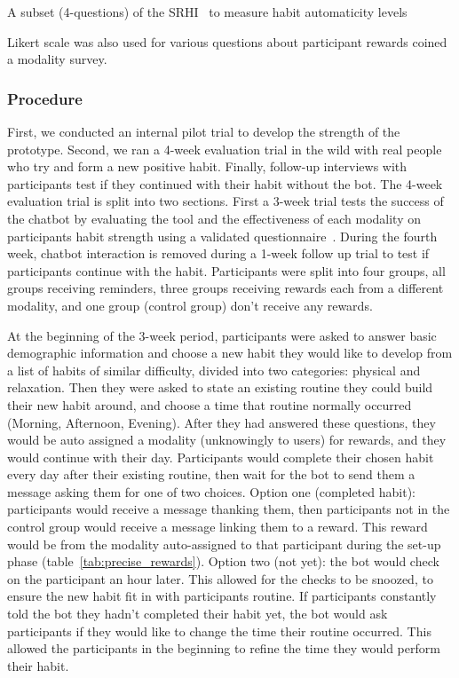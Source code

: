 \documentclass{scaffold/sigchi}
\begin{document}
A subset (4-questions) of the SRHI~\cite{article_habit_strength}  to measure habit automaticity levels

Likert scale was also used for various questions about participant rewards coined a modality survey.
 
 
\subsubsection{Procedure}
First, we conducted an internal pilot trial to develop the strength of the prototype. Second, we ran a 4-week evaluation trial in the wild with real people who try and form a new positive habit. Finally, follow-up interviews with participants test if they continued with their habit without the bot.\newline
\newline
The 4-week evaluation trial is split into two sections. First a 3-week trial tests the success of the chatbot by evaluating the tool and the effectiveness of each modality on participants habit strength using a validated questionnaire~\cite{article_habit_measurement}. During the fourth week, chatbot interaction is removed during a 1-week follow up trial to test if participants continue with the habit. Participants were split into four groups, all groups receiving reminders, three groups receiving rewards each from a different modality, and one group (control group) don't receive any rewards.


At the beginning of the 3-week period, participants were asked to answer basic demographic information and choose a new habit they would like to develop from a list of habits of similar difficulty, divided into two categories: physical and relaxation. Then they were asked to state an existing routine they could build their new habit around, and choose a time that routine normally occurred (Morning, Afternoon, Evening). After they had answered these questions, they would be auto assigned a modality (unknowingly to users) for rewards, and they would continue with their day. Participants would complete their chosen habit every day after their existing routine, then wait for the bot to send them a message asking them for one of two choices.\newline
\newline
Option one (completed habit): participants would receive a message thanking them, then participants not in the control group would receive a message linking them to a reward. This reward would be from the modality auto-assigned to that participant during the set-up phase (table~\ref{tab:precise_rewards}). Option two (not yet): the bot would check on the participant an hour later. This allowed for the checks to be snoozed, to ensure the new habit fit in with participants routine. If participants constantly told the bot they hadn't completed their habit yet, the bot would ask participants if they would like to change the time their routine occurred. This allowed the participants in the beginning to refine the time they would perform their habit.
\end{document}
